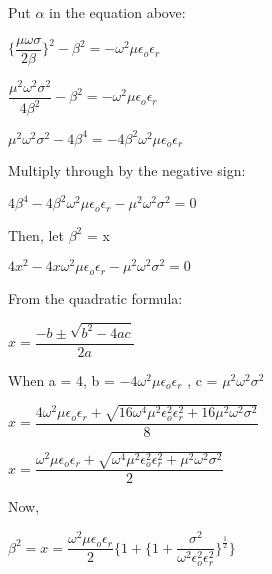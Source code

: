 Put $\alpha$ in the equation above:

\begin{center}
	$\bigg\{\dfrac{\mu\omega\sigma}{2\beta}\bigg\}^{2} - \beta^{2} = -\omega^{2}\mu\epsilon_{o}\epsilon_{r}$
\end{center}

\begin{center}
	$\dfrac{\mu^{2}\omega^{2}\sigma^{2}}{4\beta^{2}} - \beta^{2} = -\omega^{2}\mu\epsilon_{o}\epsilon_{r}$
\end{center}

\begin{center}
	$\mu^{2}\omega^{2}\sigma^{2} - 4\beta^{4} = -4\beta^{2}\omega^{2}\mu\epsilon_{o}\epsilon_{r}$
\end{center}
 
 Multiply through by the negative sign:
 
 \begin{center}
 	$4\beta^{4} -4\beta^{2}\omega^{2}\mu\epsilon_{o}\epsilon_{r} - \mu^{2}\omega^{2}\sigma^{2} = 0$
 \end{center}

Then, let $\beta^{2}$ = x
\begin{center}
	$4x^{2} -4x\omega^{2}\mu\epsilon_{o}\epsilon_{r} - \mu^{2}\omega^{2}\sigma^{2} = 0$
\end{center}

From the quadratic formula:

\begin{center}
$x = \dfrac{-b\pm \sqrt{b^{2} - 4ac}}{2a}$
\end{center}

When a = 4, b = $-4\omega^{2}\mu\epsilon_{o}\epsilon_{r}$ , c = $\mu^{2}\omega^{2}\sigma^{2}$
 
\begin{center}
	$x = \dfrac{4\omega^{2}\mu\epsilon_{o}\epsilon_{r} + \sqrt{16\omega^{4}\mu^{2}\epsilon_{o}^{2}\epsilon_{r}^{2} + 16\mu^{2}\omega^{2}\sigma^{2}}}{8}$
\end{center}

\begin{center}
	$x = \dfrac{\omega^{2}\mu\epsilon_{o}\epsilon_{r} + \sqrt{\omega^{4}\mu^{2}\epsilon_{o}^{2}\epsilon_{r}^{2} + \mu^{2}\omega^{2}\sigma^{2}}}{2}$
\end{center}

Now,
\begin{center}
	$\beta^{2} = x = \dfrac{\omega^{2}\mu\epsilon_{o}\epsilon_{r}}{2}\Bigg\{1 + \bigg\{1 + \dfrac{\sigma^{2}}{\omega^{2}\epsilon_{o}^{2}\epsilon_{r}^{2}}\bigg\}^{\frac{1}{2}}\Bigg\}$
\end{center}

